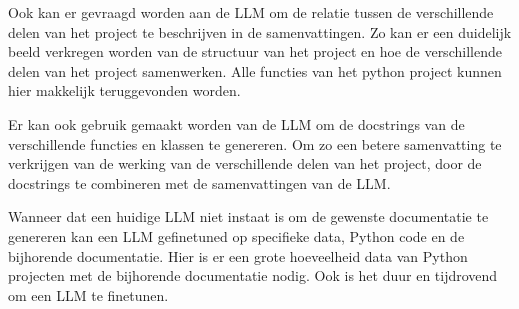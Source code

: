 Ook kan er gevraagd worden aan de LLM om de relatie tussen de verschillende delen van het project te beschrijven in de samenvattingen.
Zo kan er een duidelijk beeld verkregen worden van de structuur van het project en hoe de verschillende delen van het project samenwerken.
Alle functies van het python project kunnen hier makkelijk teruggevonden worden.

Er kan ook gebruik gemaakt worden van de LLM om de docstrings van de verschillende functies en klassen te genereren. 
Om zo een betere samenvatting te verkrijgen van de werking van de verschillende delen van het project, door de docstrings te combineren met de samenvattingen van de LLM.

Wanneer dat een huidige LLM niet instaat is om de gewenste documentatie te genereren kan een LLM gefinetuned op specifieke data, Python code en de bijhorende documentatie.
Hier is er een grote hoeveelheid data van Python projecten met de bijhorende documentatie nodig. Ook is het duur en tijdrovend om een LLM te finetunen.